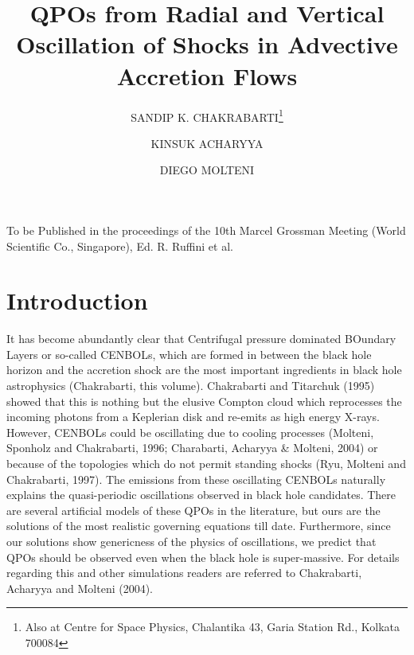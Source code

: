 \documentclass{ws-procs975x65}
\begin{document}
\title{QPOs from Radial and Vertical Oscillation of Shocks in Advective Accretion Flows}


\author{SANDIP K. CHAKRABARTI\footnote{\uppercase{A}lso at \uppercase{C}entre for 
\uppercase{S}pace \uppercase{P}hysics, \uppercase{C}halantika 43, \uppercase{G}aria 
\uppercase{S}tation \uppercase{R}d., \uppercase{K}olkata 700084}}
\address{S.N. Bose National Centre for Basic Sciences,\\
JD-Block, Salt Lake, Kolkata 700098\\
E-mail: chakraba@bose.res.in}

\author{KINSUK ACHARYYA}
\address{Centre for Space Physics, Chalantika 43, Garia Station Rd., 
Garia, Kolkata, 700084\\ e-mail:space\_phys@vsnl.com}

\author{DIEGO MOLTENI}
\address{Dipartimento di Fisica e Tecnologie Relative,\\
Viale delle Scienze, 90128 Palermo, Italy; e-mail:molteni@unipa.it}

\maketitle


\noindent To be Published in the proceedings of the 10th Marcel Grossman Meeting (World Scientific Co., Singapore),
Ed. R. Ruffini et al.

\section{Introduction}

It has become abundantly clear that Centrifugal pressure dominated BOundary Layers or so-called
CENBOLs, which are formed in between the black hole horizon and the accretion shock are
the most important ingredients in black hole astrophysics (Chakrabarti, this volume). Chakrabarti
and Titarchuk (1995) showed that this is nothing but the elusive Compton cloud which 
reprocesses the incoming photons from a Keplerian disk and re-emits as high energy X-rays. However,
CENBOLs could be oscillating due to cooling processes (Molteni, Sponholz and Chakrabarti, 1996; Charabarti, Acharyya \& Molteni, 2004) 
or because of the topologies which do not permit standing shocks (Ryu, Molteni and 
Chakrabarti, 1997). The emissions from these oscillating CENBOLs naturally
explains the quasi-periodic oscillations observed in black hole candidates. There
are several artificial models of these QPOs in the literature, but ours are the solutions
of the most realistic governing equations till date. Furthermore, since our solutions show genericness of the physics
of oscillations, we predict that QPOs should be observed  even when the black hole 
is super-massive. For details regarding this and other simulations readers are
referred to Chakrabarti, Acharyya and Molteni (2004). 
\end{document}
